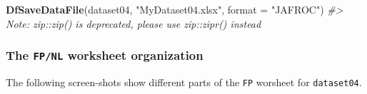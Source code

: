 \documentclass[]{book}
\newenvironment{Shaded}{\begin{snugshade}}{\end{snugshade}}
\newcommand{\CommentTok}[1]{\textcolor[rgb]{0.56,0.35,0.01}{\textit{#1}}}
\newcommand{\DataTypeTok}[1]{\textcolor[rgb]{0.13,0.29,0.53}{#1}}
\newcommand{\KeywordTok}[1]{\textcolor[rgb]{0.13,0.29,0.53}{\textbf{#1}}}
\newcommand{\NormalTok}[1]{#1}
\newcommand{\StringTok}[1]{\textcolor[rgb]{0.31,0.60,0.02}{#1}}
\begin{document}
\begin{Shaded}
\begin{Highlighting}[]
\KeywordTok{DfSaveDataFile}\NormalTok{(dataset04, }\StringTok{"MyDataset04.xlsx"}\NormalTok{, }\DataTypeTok{format =} \StringTok{"JAFROC"}\NormalTok{)}
\CommentTok{#> Note: zip::zip() is deprecated, please use zip::zipr() instead}
\end{Highlighting}
\end{Shaded}

\hypertarget{the-fpnl-worksheet-organization-1}{%
\subsubsection{\texorpdfstring{The \texttt{FP/NL} worksheet organization}{The FP/NL worksheet organization}}\label{the-fpnl-worksheet-organization-1}}

The following screen-shots show different parts of the \texttt{FP} worsheet for \texttt{dataset04}.
\end{document}
